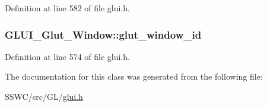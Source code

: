 Definition at line 582 of file glui.\+h.

\hypertarget{class_g_l_u_i___glut___window_a1eeae65875356396ec81ffd63d0b096a}{
\subsubsection[{glut\+\_\+window\+\_\+id}]{ G\+L\+U\+I\+\_\+\+Glut\+\_\+\+Window\+::glut\+\_\+window\+\_\+id}}\label{class_g_l_u_i___glut___window_a1eeae65875356396ec81ffd63d0b096a}


Definition at line 574 of file glui.\+h.



The documentation for this class was generated from the following file\+:\begin{DoxyCompactItemize}
\item 
S\+S\+W\+C/src/\+G\+L/\hyperlink{glui_8h}{glui.\+h}\end{DoxyCompactItemize}
